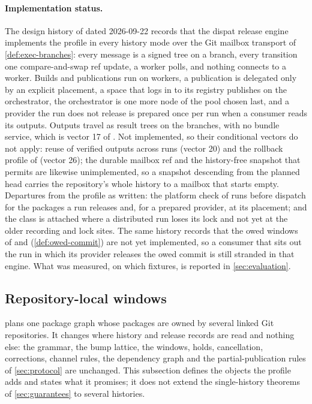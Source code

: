 \paragraph{Implementation status.}
The design history of \SPEC{} dated 2026-09-22 records that the dispat
release engine implements the profile in every history mode over the Git
mailbox transport of \cref{def:exec-branches}: every message is a signed tree
on a branch, every transition one compare-and-swap ref update, a worker
polls, and nothing connects to a worker. Builds and publications run on
workers, a publication is delegated only by an explicit placement, a space
that logs in to its registry publishes on the orchestrator, the orchestrator
is one more node of the pool chosen last, and a provider the run does not
release is prepared once per run when a consumer reads its outputs. Outputs
travel as result trees on the branches, with no bundle service, which is
vector 17 of . Not implemented, so their conditional vectors do
not apply: reuse of verified outputs across runs (vector 20) and the rollback
profile of  (vector 26); the durable mailbox ref and the
history-free snapshot that  permits are likewise unimplemented, so
a snapshot descending from the planned head carries the repository's whole
history to a mailbox that starts empty. Departures from the profile as
written: the platform check of  runs before dispatch for the
packages a run releases and, for a prepared provider, at its placement; and
the  class is attached where a distributed run
loses its lock and not yet at the older recording and lock sites. The same
history records that the owed windows of  and 
(\cref{def:owed-commit}) are not yet implemented, so a consumer that sits out
the run in which its provider releases the owed commit is still stranded in
that engine. What was measured, on which fixtures, is reported in
\cref{sec:evaluation}.

\subsection{Repository-local windows}
\label{sec:exec-polyrepo}

 plans one package graph whose packages are owned by several linked
Git repositories. It changes where history and release records are read and
nothing else: the grammar, the bump lattice, the windows, holds,
cancellation, corrections, channel rules, the dependency graph and the
partial-publication rules of \cref{sec:protocol} are unchanged. This
subsection defines the objects the profile adds and states what it promises;
it does not extend the single-history theorems of \cref{sec:guarantees} to
several histories.

